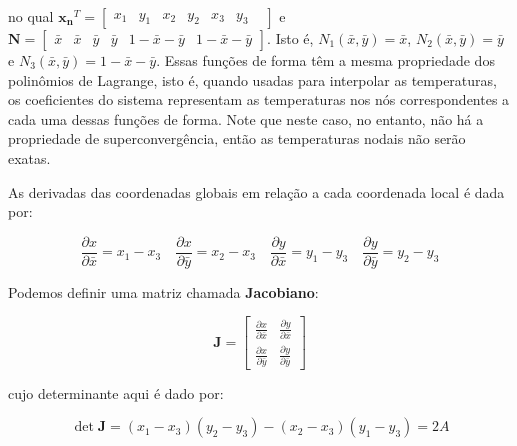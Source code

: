         \noindent no qual $\mathbf{x_n}^T = 
        \begin{bmatrix}
                x_1 &
                y_1 &
                x_2 &
                y_2 &
                x_3 &
                y_3 &
            \end{bmatrix}$ e $ 
            \mathbf{N} = 
            \begin{bmatrix}
                \bar{x} &
                \bar{x} &
                \bar{y} &
                \bar{y} &
                1 - \bar{x} - \bar{y} &
                1 - \bar{x} - \bar{y}
            \end{bmatrix}$. Isto é, $N_1(\bar{x},\bar{y}) = \bar{x}$, $N_2(\bar{x},\bar{y}) = \bar{y}$ e $N_3(\bar{x},\bar{y}) = 1 - \bar{x} - \bar{y}$. Essas funções de forma têm a mesma propriedade dos polinômios de Lagrange, isto é, quando usadas para interpolar as temperaturas, os coeficientes do sistema representam as temperaturas nos nós correspondentes a cada uma dessas funções de forma. Note que neste caso, no entanto, não há a propriedade de superconvergência, então as temperaturas nodais não serão exatas.

        As derivadas das coordenadas globais em relação a cada coordenada local é dada por:

        \begin{equation*}
            \frac{\partial x}{\partial \bar{x}} = x_1 - x_3 \quad \frac{\partial x}{\partial \bar{y}} = x_2 - x_3
            \quad \frac{\partial y}{\partial \bar{x}} = y_1 - y_3 \quad \frac{\partial y}{\partial \bar{y}} = y_2 - y_3
        \end{equation*}

        Podemos definir uma matriz chamada \textbf{Jacobiano}:

        \begin{equation}
            \mathbf{J} = 
            \begin{bmatrix}
                 \frac{\partial x}{\partial \bar{x}} &  \frac{\partial y}{\partial \bar{x}}\\
                 \frac{\partial x}{\partial \bar{y}} &  \frac{\partial y}{\partial \bar{y}}
            \end{bmatrix}
        \end{equation}

        \noindent cujo determinante aqui é dado por:

        \begin{equation}
            \det \mathbf{J} = \left(x_1 - x_3\right)\left(y_2 - y_3\right) - \left(x_2 - x_3\right)\left(y_1 - y_3\right) = 2A
        \end{equation}

